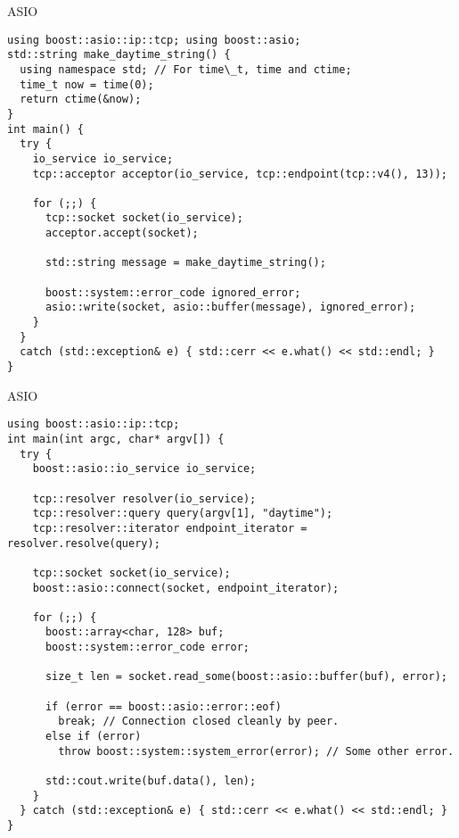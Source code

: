 \documentclass{beamer}
\begin{document}
\begin{frame}[fragile]{ASIO}
    \begin{lstlisting}
using boost::asio::ip::tcp; using boost::asio;
std::string make_daytime_string() {
  using namespace std; // For time\_t, time and ctime;
  time_t now = time(0);
  return ctime(&now);
}
int main() {
  try {
    io_service io_service;
    tcp::acceptor acceptor(io_service, tcp::endpoint(tcp::v4(), 13));

    for (;;) {
      tcp::socket socket(io_service);
      acceptor.accept(socket);

      std::string message = make_daytime_string();

      boost::system::error_code ignored_error;
      asio::write(socket, asio::buffer(message), ignored_error);
    }
  }
  catch (std::exception& e) { std::cerr << e.what() << std::endl; }
} 
    \end{lstlisting}
\end{frame}

\begin{frame}[fragile]{ASIO}
\begin{lstlisting}
using boost::asio::ip::tcp;
int main(int argc, char* argv[]) {
  try {
    boost::asio::io_service io_service;

    tcp::resolver resolver(io_service);
    tcp::resolver::query query(argv[1], "daytime");
    tcp::resolver::iterator endpoint_iterator = resolver.resolve(query);

    tcp::socket socket(io_service);
    boost::asio::connect(socket, endpoint_iterator);

    for (;;) {
      boost::array<char, 128> buf;
      boost::system::error_code error;

      size_t len = socket.read_some(boost::asio::buffer(buf), error);

      if (error == boost::asio::error::eof)
        break; // Connection closed cleanly by peer.
      else if (error)
        throw boost::system::system_error(error); // Some other error.

      std::cout.write(buf.data(), len);
    }
  } catch (std::exception& e) { std::cerr << e.what() << std::endl; }
}
\end{lstlisting}
\end{frame}
\end{document}
